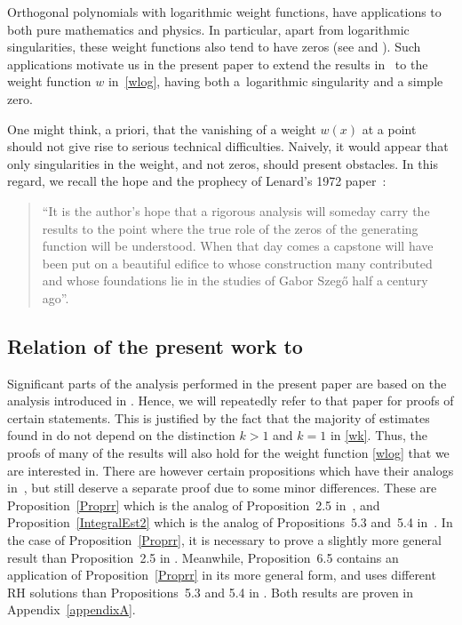 \documentclass[11pt]{article}
\numberwithin{equation}{section}
\numberwithin{equation}{section}
\begin{document}
Orthogonal polynomials with logarithmic weight functions, have applications to both pure mathematics and physics. In particular, apart from logarithmic singularities, these weight functions also tend to have zeros (see \cite[Section~8]{Mag18} and \cite{VA}). Such applications motivate us in the present paper to extend the results in~\cite{CD} to the weight function $w$ in~\eqref{wlog}, having both a~logarithmic singularity and a simple zero.

\begin{Remark}
 One might think, a priori, that the vanishing of a weight $w(x)$ at a point should not give rise to serious technical difficulties. Naively, it would appear that only singularities in the weight, and not zeros, should present obstacles. In this regard, we recall the hope and the prophecy of Lenard's 1972 paper~\cite{Lenard}:
 \begin{quote}
 ``It is the author’s hope that a
rigorous analysis will someday carry the results to the point where the true role of the zeros of the
generating function will be understood. When that day comes a capstone will have been put on a
beautiful edifice to whose construction many contributed and whose foundations lie in the studies
of Gabor Szeg\H{o} half a century ago''.
\end{quote}
\end{Remark}

\subsection[Relation of the present work to cite\{CD\}]{Relation of the present work to \cite{CD}}

Significant parts of the analysis performed in the present paper are based on the analysis introduced in \cite{CD}. Hence, we will repeatedly refer to that paper for proofs of certain statements. This is justified by the fact that the majority of estimates found in \cite{CD} do not depend on the distinction $k > 1$ and $k = 1$ in \eqref{wk}. Thus, the proofs of many of the results will also hold for the weight function \eqref{wlog} that we are interested in. There are however certain propositions which have their analogs in~\cite{CD}, but still deserve a separate proof due to some minor differences. These are Proposition~\ref{Proprr} which is the analog of Proposition~2.5 in~\cite{CD}, and Proposition~\ref{IntegralEst2} which is the analog of Propositions~5.3 and~5.4 in~\cite{CD}. In the case of Proposition~\ref{Proprr}, it is necessary to prove a slightly more general result than Proposition~2.5 in \cite{CD}. Meanwhile, Proposition~6.5 contains an application of Proposition~\ref{Proprr} in its more general form, and uses different RH solutions than Propositions~5.3 and 5.4 in \cite{CD}. Both results are proven in Appendix~\ref{appendixA}.
\end{document}
